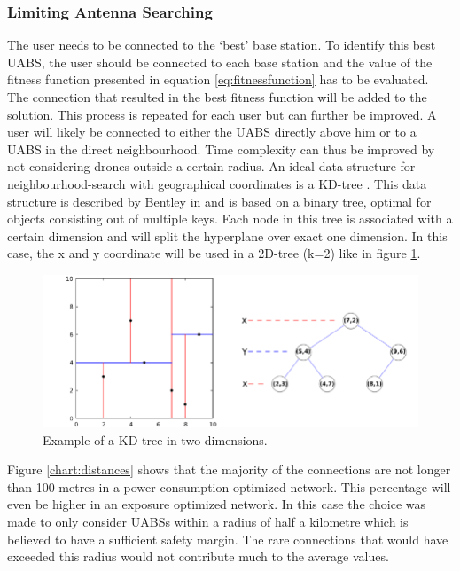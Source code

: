 \subsubsection{Limiting Antenna Searching}
The user needs to be connected to the `best' base station. To identify this best \gls{UABS}, the user should be connected 
to each base station and the value of the fitness function presented in equation \ref{eq:fitnessfunction} has to be evaluated. 
The connection that resulted in the best fitness function
will be added to the solution. This process is repeated for each user but can further be improved. 
A user will likely be connected to either the
\gls{UABS} directly above him or to a \gls{UABS} in the direct neighbourhood. 
Time complexity can thus be improved by not considering drones outside a certain radius.
An ideal data structure for neighbourhood-search with geographical coordinates is a KD-tree \cite{J27,J28}. 
This data structure  is described by Bentley in \cite{J29}  and is based on a binary tree, optimal for objects consisting out of 
multiple keys.
Each node in this tree is associated with a certain dimension and will split the hyperplane over exact one dimension.
In this case, the x and y coordinate will be used in a 2D-tree (k=2) like in figure \ref{fig:exampleKDtree}.

\begin{figure}[]
  \centering
  \includegraphics[width=\textwidth/10*9]{../images/Example-of-a-2D-k-d-tree.png}
  \caption{Example of a KD-tree in two dimensions.}
  \label{fig:exampleKDtree}
\end{figure}

Figure \ref{chart:distances} shows that the majority of the connections are not longer than 100 metres in a power consumption 
optimized network. This percentage will even be higher in  an exposure optimized network.
In this case the choice was made to only consider \gls{UABS}s within a radius of half a kilometre which is believed 
to have a sufficient safety margin. The rare connections that would have exceeded this radius would not contribute much to 
the average values.

